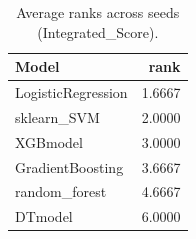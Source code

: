 \begin{table}[t]
\centering
\begin{tabular}{lr}
\toprule
Model & rank \\
\midrule
LogisticRegression & 1.6667 \\
sklearn_SVM & 2.0000 \\
XGBmodel & 3.0000 \\
GradientBoosting & 3.6667 \\
random_forest & 4.6667 \\
DTmodel & 6.0000 \\
\bottomrule
\end{tabular}
\caption{Average ranks across seeds (Integrated_Score).}
\label{tab:avg_rank_Integrated_Score}
\end{table}